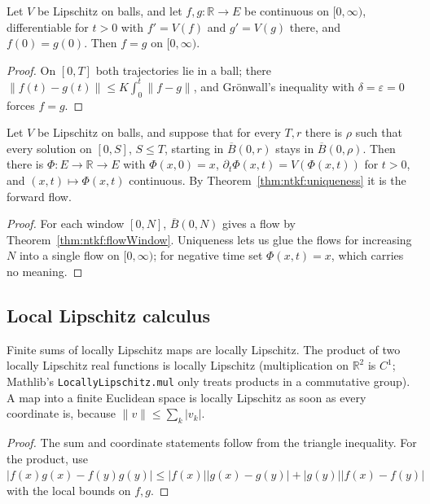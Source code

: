 \begin{theorem}\label{thm:ntkf:uniqueness}
  \leanok
Let $V$ be Lipschitz on balls, and let $f,g:\mathbb R\to E$ be continuous on $[0,\infty)$,
differentiable for $t>0$ with $f'=V(f)$ and $g'=V(g)$ there, and $f(0)=g(0)$. Then $f=g$ on
$[0,\infty)$.
\end{theorem}

\begin{proof}
  \leanok
On $[0,T]$ both trajectories lie in a ball; there $\|f(t)-g(t)\|\le K\int_0^t\|f-g\|$, and Gr\"onwall's
inequality with $\delta=\varepsilon=0$ forces $f=g$.
\end{proof}

\begin{theorem}\label{thm:ntkf:forwardFlow}
  \leanok
Let $V$ be Lipschitz on balls, and suppose that for every $T,r$ there is $\rho$ such that every
solution on $[0,S]$, $S\le T$, starting in $\overline B(0,r)$ stays in $\overline B(0,\rho)$.
Then there is $\Phi:E\to\mathbb R\to E$ with $\Phi(x,0)=x$, $\partial_t\Phi(x,t)=V(\Phi(x,t))$ for
$t>0$, and $(x,t)\mapsto\Phi(x,t)$ continuous. By Theorem~\ref{thm:ntkf:uniqueness} it is the
forward flow.
\end{theorem}

\begin{proof}
  \leanok
For each window $[0,N]$, $\overline B(0,N)$ gives a flow by Theorem~\ref{thm:ntkf:flowWindow}.
Uniqueness lets us glue the flows for increasing $N$ into a single flow on $[0,\infty)$; for negative
time set $\Phi(x,t)=x$, which carries no meaning.
\end{proof}

\subsection{Local Lipschitz calculus}

\begin{lemma}\label{lem:ntkf:locLip}
  \leanok
Finite sums of locally Lipschitz maps are locally Lipschitz. The product of two locally Lipschitz
real functions is locally Lipschitz (multiplication on $\mathbb R^2$ is $C^1$; Mathlib's
\texttt{LocallyLipschitz.mul} only treats products in a commutative group). A map into a finite
Euclidean space is locally Lipschitz as soon as every coordinate is, because $\|v\|\le\sum_k|v_k|$.
\end{lemma}

\begin{proof}
  \leanok
The sum and coordinate statements follow from the triangle inequality. For the product, use
$|f(x)g(x)-f(y)g(y)|\le|f(x)||g(x)-g(y)|+|g(y)||f(x)-f(y)|$ with the local bounds on $f,g$.
\end{proof}
